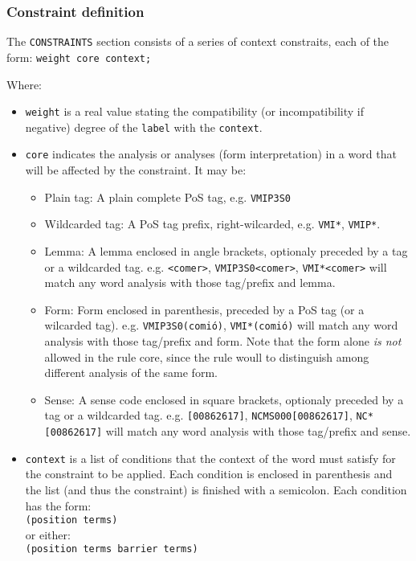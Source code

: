 \documentclass[a4paper]{book}
\begin{document}
\subsubsection{Constraint definition}
   The {\tt CONSTRAINTS} section consists of a series of context
   constraits, each of the form: {\tt weight core context;}

    Where:
    \begin{itemize}
      \item {\tt weight} is a real value stating the compatibility (or
	incompatibility if negative) degree of the {\tt label} with the
	{\tt context}.
      \item {\tt core} indicates the analysis or
	analyses  (form interpretation) in a word that will 
        be affected by the constraint. It may be:
	\begin{itemize}
	\item Plain tag:  A plain complete PoS tag,  e.g. {\tt VMIP3S0}
	\item Wildcarded tag:  A PoS tag prefix, right-wilcarded, 
              e.g. {\tt VMI*}, {\tt VMIP*}. 
	\item Lemma: A lemma enclosed in angle brackets, optionaly
	  preceded by a tag or a wildcarded tag.
	  e.g.  \verb#<comer>#, \verb#VMIP3S0<comer>#,
	  \verb#VMI*<comer># will match any
	  word analysis with those tag/prefix and lemma.
	\item Form: Form enclosed in parenthesis, preceded by a PoS tag (or a
	  wilcarded tag).
	  e.g.  {\tt VMIP3S0(comi\'o)},  {\tt VMI*(comi\'o)} will match any
	  word analysis with those tag/prefix and form.
          Note that the form alone {\em is not} allowed in the rule core,
	  since the rule woull to distinguish among different analysis of
	  the same form.
	\item Sense: A sense code enclosed in square brackets, optionaly
	  preceded by a tag or a wildcarded tag.
	  e.g.  \verb#[00862617]#, \verb#NCMS000[00862617]#,
          \verb#NC*[00862617]# will match any
	  word analysis with those tag/prefix and sense.
	\end{itemize}
      \item {\tt context} is a list of conditions that the context of
        the word must satisfy for the constraint to be applied.
	Each condition is enclosed in parenthesis and the list (and
        thus the constraint) is finished with a semicolon.
	Each condition has the form: \\
	{\tt (position terms)} \\
	or either:\\
	{\tt (position terms barrier terms)} 
 

\end{itemize}
\end{document}
